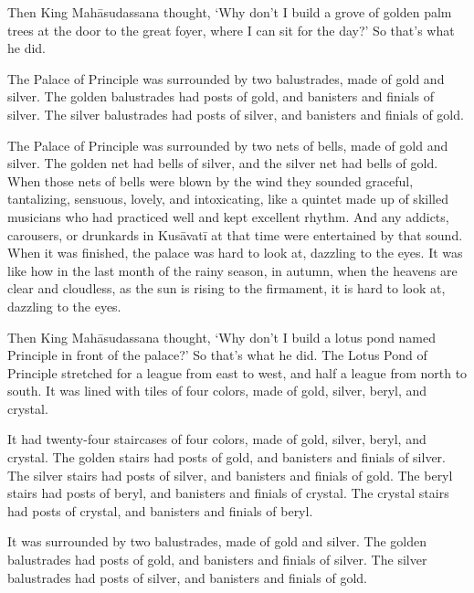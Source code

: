 \documentclass[12pt,openany]{book}%
\begin{document}
Then King \textsanskrit{Mahāsudassana} thought, ‘Why don’t I build a grove of golden palm trees at the door to the great foyer, where I can sit for the day?’ So that’s what he did. 

The Palace of Principle was surrounded by two balustrades, made of gold and silver. The golden balustrades had posts of gold, and banisters and finials of silver. The silver balustrades had posts of silver, and banisters and finials of gold. 

The Palace of Principle was surrounded by two nets of bells, made of gold and silver. The golden net had bells of silver, and the silver net had bells of gold. When those nets of bells were blown by the wind they sounded graceful, tantalizing, sensuous, lovely, and intoxicating, like a quintet made up of skilled musicians who had practiced well and kept excellent rhythm. And any addicts, carousers, or drunkards in \textsanskrit{Kusāvatī} at that time were entertained by that sound. When it was finished, the palace was hard to look at, dazzling to the eyes. It was like how in the last month of the rainy season, in autumn, when the heavens are clear and cloudless, as the sun is rising to the firmament, it is hard to look at, dazzling to the eyes. 

Then King \textsanskrit{Mahāsudassana} thought, ‘Why don’t I build a lotus pond named Principle in front of the palace?’ So that’s what he did. The Lotus Pond of Principle stretched for a league from east to west, and half a league from north to south. It was lined with tiles of four colors, made of gold, silver, beryl, and crystal. 

It had twenty-four staircases of four colors, made of gold, silver, beryl, and crystal. The golden stairs had posts of gold, and banisters and finials of silver. The silver stairs had posts of silver, and banisters and finials of gold. The beryl stairs had posts of beryl, and banisters and finials of crystal. The crystal stairs had posts of crystal, and banisters and finials of beryl. 

It was surrounded by two balustrades, made of gold and silver. The golden balustrades had posts of gold, and banisters and finials of silver. The silver balustrades had posts of silver, and banisters and finials of gold. 
\end{document}
